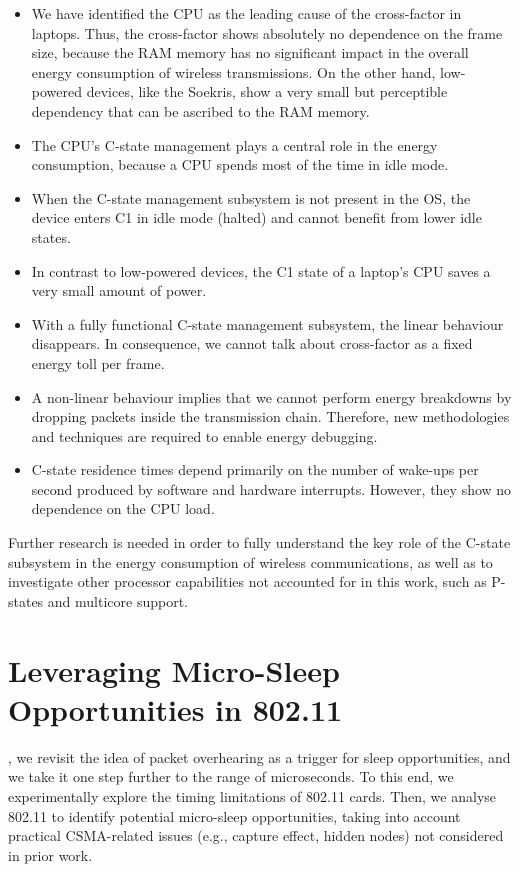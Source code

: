 \documentclass[twoside,nohyper]{tufte-book}
\providecommand{\tightlist}{%
  \setlength{\itemsep}{0pt}\setlength{\parskip}{0pt}}
\theoremstyle{definition}
\theoremstyle{definition}
\theoremstyle{definition}
\theoremstyle{remark}
\begin{document}
\begin{itemize}
\tightlist
\item
  We have identified the CPU as the leading cause of the cross-factor in
  laptops. Thus, the cross-factor shows absolutely no dependence on the
  frame size, because the RAM memory has no significant impact in the
  overall energy consumption of wireless transmissions. On the other
  hand, low-powered devices, like the Soekris, show a very small but
  perceptible dependency that can be ascribed to the RAM memory.
\item
  The CPU's C-state management plays a central role in the energy
  consumption, because a CPU spends most of the time in idle mode.
\item
  When the C-state management subsystem is not present in the OS, the
  device enters C1 in idle mode (halted) and cannot benefit from lower
  idle states.
\item
  In contrast to low-powered devices, the C1 state of a laptop's CPU
  saves a very small amount of power.
\item
  With a fully functional C-state management subsystem, the linear
  behaviour disappears. In consequence, we cannot talk about
  cross-factor as a fixed energy toll per frame.
\item
  A non-linear behaviour implies that we cannot perform energy
  breakdowns by dropping packets inside the transmission chain.
  Therefore, new methodologies and techniques are required to enable
  energy debugging.
\item
  C-state residence times depend primarily on the number of wake-ups per
  second produced by software and hardware interrupts. However, they
  show no dependence on the CPU load.
\end{itemize}

Further research is needed in order to fully understand the key role of
the C-state subsystem in the energy consumption of wireless
communications, as well as to investigate other processor capabilities
not accounted for in this work, such as P-states and multicore support.

\chapter{Leveraging Micro-Sleep Opportunities in 802.11}\label{ch:05}

, we revisit the idea of packet overhearing
as a trigger for sleep opportunities, and we take it one step further to
the range of microseconds. To this end, we experimentally explore the
timing limitations of 802.11 cards. Then, we analyse 802.11 to identify
potential micro-sleep opportunities, taking into account practical
CSMA-related issues (e.g., capture effect, hidden nodes) not considered
in prior work.
\end{document}
